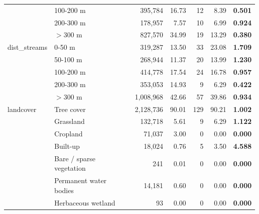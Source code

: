\begin{table}[htbp]
\begin{tabular}{llrrrrr}
 & 100-200 m & 395,784 & 16.73 & 12 & 8.39 & \textbf{0.501} \\
 & 200-300 m & 178,957 & 7.57 & 10 & 6.99 & \textbf{0.924} \\
 & $>$300 m & 827,570 & 34.99 & 19 & 13.29 & \textbf{0.380} \\
dist\_streams & 0-50 m & 319,287 & 13.50 & 33 & 23.08 & \textbf{1.709} \\
 & 50-100 m & 268,944 & 11.37 & 20 & 13.99 & \textbf{1.230} \\
 & 100-200 m & 414,778 & 17.54 & 24 & 16.78 & \textbf{0.957} \\
 & 200-300 m & 353,053 & 14.93 & 9 & 6.29 & \textbf{0.422} \\
 & $>$300 m & 1,008,968 & 42.66 & 57 & 39.86 & \textbf{0.934} \\
landcover & Tree cover & 2,128,736 & 90.01 & 129 & 90.21 & \textbf{1.002} \\
 & Grassland & 132,718 & 5.61 & 9 & 6.29 & \textbf{1.122} \\
 & Cropland & 71,037 & 3.00 & 0 & 0.00 & \textbf{0.000} \\
 & Built-up & 18,024 & 0.76 & 5 & 3.50 & \textbf{4.588} \\
 & Bare / sparse vegetation & 241 & 0.01 & 0 & 0.00 & \textbf{0.000} \\
 & Permanent water bodies & 14,181 & 0.60 & 0 & 0.00 & \textbf{0.000} \\
 & Herbaceous wetland & 93 & 0.00 & 0 & 0.00 & \textbf{0.000} \\
\hline
\end{tabular}
\end{table}